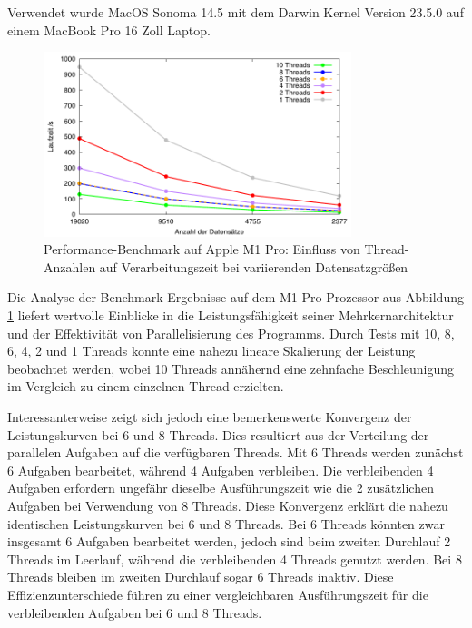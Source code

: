 Verwendet wurde MacOS Sonoma 14.5 mit dem Darwin Kernel Version 23.5.0 auf einem MacBook Pro 16 Zoll Laptop.

\begin{figure}[H]
\centering
\includegraphics[width=0.8\textwidth]{../results/plots/m1pro/comp_all_threads.pdf}
\caption{Performance-Benchmark auf Apple M1 Pro: Einfluss von Thread-Anzahlen auf Verarbeitungszeit bei variierenden Datensatzgrößen}
\label{fig:m1pro_benchmark_threads}
\end{figure}

Die Analyse der Benchmark-Ergebnisse auf dem M1 Pro-Prozessor aus Abbildung \ref{fig:m1pro_benchmark_threads} liefert wertvolle Einblicke in die Leistungsfähigkeit seiner Mehrkernarchitektur und der Effektivität von Parallelisierung des Programms. Durch Tests mit 10, 8, 6, 4, 2 und 1 Threads konnte eine nahezu lineare Skalierung der Leistung beobachtet werden, wobei 10 Threads annähernd eine zehnfache Beschleunigung im Vergleich zu einem einzelnen Thread erzielten.

Interessanterweise zeigt sich jedoch eine bemerkenswerte Konvergenz der Leistungskurven bei 6 und 8 Threads. Dies resultiert aus der Verteilung der parallelen Aufgaben auf die verfügbaren Threads. Mit 6 Threads werden zunächst 6 Aufgaben bearbeitet, während 4 Aufgaben verbleiben. Die verbleibenden 4 Aufgaben erfordern ungefähr dieselbe Ausführungszeit wie die 2 zusätzlichen Aufgaben bei Verwendung von 8 Threads. Diese Konvergenz erklärt die nahezu identischen Leistungskurven bei 6 und 8 Threads.
Bei 6 Threads könnten zwar insgesamt 6 Aufgaben bearbeitet werden, jedoch sind beim zweiten Durchlauf 2 Threads im Leerlauf, während die verbleibenden 4 Threads genutzt werden. Bei 8 Threads bleiben im zweiten Durchlauf sogar 6 Threads inaktiv. Diese Effizienzunterschiede führen zu einer vergleichbaren Ausführungszeit für die verbleibenden Aufgaben bei 6 und 8 Threads.

